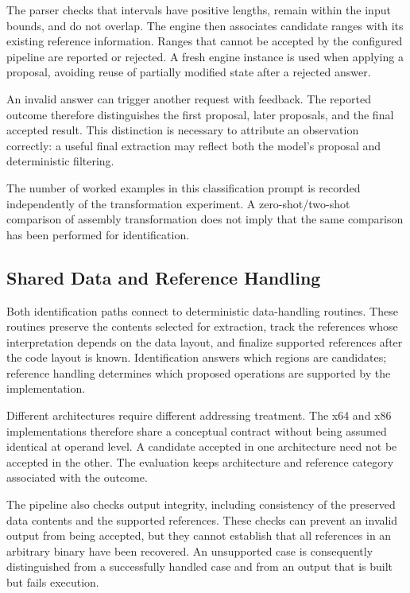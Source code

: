 The parser checks that intervals have positive lengths, remain within
the input bounds, and do not overlap. The engine then associates
candidate ranges with its existing reference information. Ranges that
cannot be accepted by the configured pipeline are reported or rejected.
A fresh engine instance is used when applying a proposal, avoiding
reuse of partially modified state after a rejected answer.

An invalid answer can trigger another request with feedback. The
reported outcome therefore distinguishes the first proposal, later
proposals, and the final accepted result. This distinction is necessary
to attribute an observation correctly: a useful final extraction may
reflect both the model's proposal and deterministic filtering.

The number of worked examples in this classification prompt is recorded
independently of the transformation experiment. A zero-shot/two-shot
comparison of assembly transformation does not imply that the same
comparison has been performed for identification.

\subsection{Shared Data and Reference Handling}
Both identification paths connect to deterministic data-handling
routines. These routines preserve the contents selected for extraction,
track the references whose interpretation depends on the data layout,
and finalize supported references after the code layout is known.
Identification answers which regions are candidates; reference handling
determines which proposed operations are supported by the implementation.

Different architectures require different addressing treatment. The
x64 and x86 implementations therefore share a conceptual contract
without being assumed identical at operand level. A candidate accepted
in one architecture need not be accepted in the other. The evaluation
keeps architecture and reference category associated with the outcome.

The pipeline also checks output integrity, including consistency of
the preserved data contents and the supported references. These checks
can prevent an invalid output from being accepted, but they cannot
establish that all references in an arbitrary binary have been recovered.
An unsupported case is consequently distinguished from a successfully
handled case and from an output that is built but fails execution.

